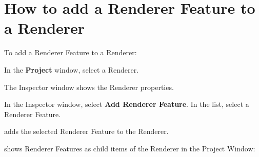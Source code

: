 \chapter{How to add a Renderer Feature to a Renderer}
\hypertarget{md__hey_tea_9_2_library_2_package_cache_2com_8unity_8render-pipelines_8universal_0d14_80_88_2_dobad63f519f0fde26755d12ecfe7020ca}{}\label{md__hey_tea_9_2_library_2_package_cache_2com_8unity_8render-pipelines_8universal_0d14_80_88_2_dobad63f519f0fde26755d12ecfe7020ca}
\label{md__hey_tea_9_2_library_2_package_cache_2com_8unity_8render-pipelines_8universal_0d14_80_88_2_dobad63f519f0fde26755d12ecfe7020ca_autotoc_md2645}%
%
 To add a Renderer Feature to a Renderer\+:


\begin{DoxyEnumerate}
\item In the {\bfseries{Project}} window, select a Renderer.



The Inspector window shows the Renderer properties.


\item In the Inspector window, select {\bfseries{Add Renderer Feature}}. In the list, select a Renderer Feature.



 adds the selected Renderer Feature to the Renderer.


\end{DoxyEnumerate}

 shows Renderer Features as child items of the Renderer in the Project Window\+:

 
